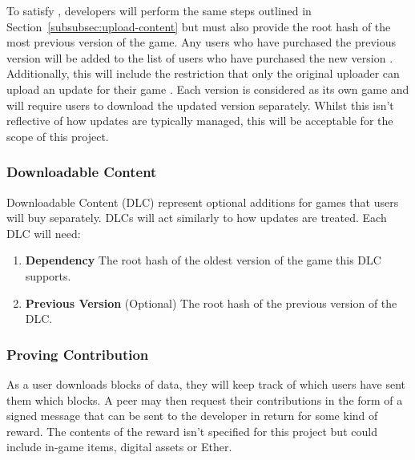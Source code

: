 To satisfy , developers will perform the same steps outlined in Section~\ref{subsubsec:upload-content} but must also provide the root hash of the most previous version of the game. Any users who have purchased the previous version will be added to the list of users who have purchased the new version . Additionally, this will include the restriction that only the original uploader can upload an update for their game .
\x
Each version is considered as its own game and will require users to download the updated version separately. Whilst this isn't reflective of how updates are typically managed, this will be acceptable for the scope of this project.

\subsubsection*{Downloadable Content}

Downloadable Content (DLC)  represent optional additions for games that users will buy separately. DLCs will act similarly to how updates are treated. Each DLC will need:

\begin{enumerate}
  \item \textbf{Dependency} The root hash of the oldest version of the game this DLC supports.
  \item \textbf{Previous Version} (Optional) The root hash of the previous version of the DLC.
\end{enumerate}

\subsubsection*{Proving Contribution}

As a user downloads blocks of data, they will keep track of which users have sent them which blocks. A peer may then request their contributions in the form of a signed message that can be sent to the developer  in return for some kind of reward. The contents of the reward isn't specified for this project but could include in-game items, digital assets or Ether.